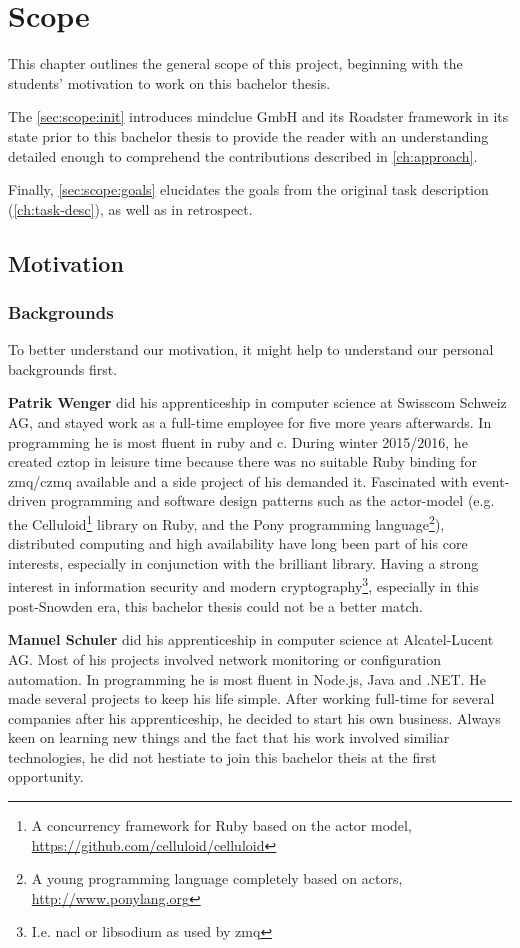 \chapter{Scope}
This chapter outlines the general scope of this project, beginning with the
students' motivation to work on this bachelor thesis.

The \autoref{sec:scope:init} introduces mindclue GmbH and its Roadster
framework in its state prior to this bachelor thesis to provide the reader with
an understanding detailed enough to comprehend the contributions described in
\autoref{ch:approach}.

Finally, \autoref{sec:scope:goals} elucidates the goals from the original task description
(\autoref{ch:task-desc}), as well as in retrospect.

\section{Motivation}
\subsection{Backgrounds}
To better understand our motivation, it might help to understand our personal
backgrounds first.

\textbf{Patrik Wenger} did his apprenticeship in computer science at Swisscom
Schweiz AG, and stayed work as a full-time employee for five more years
afterwards. In programming he is most fluent in \gls{ruby} and \gls{c}. During
winter 2015/2016, he created \gls{cztop} in leisure time because
there was no suitable Ruby binding for \gls{zmq}/\gls{czmq} available and a side
project of his demanded it. Fascinated with event-driven programming and
software design patterns such as the \gls{actor-model} (e.g. the
Celluloid\footnote{A concurrency framework for Ruby based on the actor model,
\url{https://github.com/celluloid/celluloid}} library on Ruby,
and the Pony programming language\footnote{A young programming language completely based on actors,
\url{http://www.ponylang.org}}), distributed computing and high availability
have long been part of his core interests, especially in conjunction with the
brilliant \zmq library. Having a strong interest in information security and modern
cryptography\footnote{I.e. \gls{nacl} or \gls{libsodium} as used by
\gls{zmq}}, especially in this post-Snowden era, this bachelor thesis could not
be a better match.

\textbf{Manuel Schuler} did his apprenticeship in computer science at
Alcatel-Lucent AG.  Most of his projects involved network monitoring or
configuration automation. In programming he is most fluent in Node.js, Java and .NET. He
made several projects to keep his life simple. After working full-time for
several companies after his apprenticeship, he decided to start his own
business.  Always keen on learning new things and the fact that his work
involved similiar technologies, he did not hestiate to join this bachelor theis
at the first opportunity.

